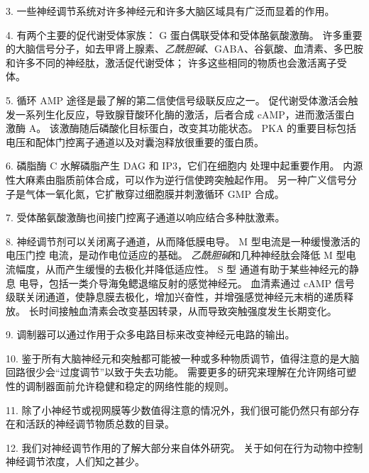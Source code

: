 3. 一些神经调节系统对许多神经元和许多大脑区域具有广泛而显着的作用。


4. 有两个主要的促代谢受体家族：
G 蛋白偶联受体和受体酪氨酸激酶。 
许多重要的大脑信号分子，如去甲肾上腺素、\textit{乙酰胆碱}、GABA、谷氨酸、血清素、多巴胺和许多不同的神经肽，激活促代谢受体；
许多这些相同的物质也会激活离子受体。 


5. 循环 AMP 途径是最了解的第二信使信号级联反应之一。
促代谢受体激活会触发一系列生化反应，导致腺苷酸环化酶的激活，后者合成 cAMP，进而激活蛋白激酶 A。
该激酶随后磷酸化目标蛋白，改变其功能状态。
PKA 的重要目标包括电压和配体门控离子通道以及对囊泡释放很重要的蛋白质。 


6. 磷脂酶 C 水解磷脂产生 DAG 和 IP3，它们在细胞内  处理中起重要作用。
内源性大麻素由脂质前体合成，可以作为逆行信使跨突触起作用。
另一种广义信号分子是气体一氧化氮，它扩散穿过细胞膜并刺激循环 GMP 合成。


7. 受体酪氨酸激酶也间接门控离子通道以响应结合多种肽激素。 


8. 神经调节剂可以关闭离子通道，从而降低膜电导。
M 型电流是一种缓慢激活的电压门控  电流，是动作电位适应的基础。
\textit{乙酰胆碱}和几种神经肽会降低 M 型电流幅度，从而产生缓慢的去极化并降低适应性。
S 型  通道有助于某些神经元的静息  电导，包括一类介导海兔鳃退缩反射的感觉神经元。
血清素通过 cAMP 信号级联关闭通道，使静息膜去极化，增加兴奋性，并增强感觉神经元末梢的递质释放。
长时间接触血清素会改变基因转录，从而导致突触强度发生长期变化。 


9. 调制器可以通过作用于众多电路目标来改变神经元电路的输出。 


10. 鉴于所有大脑神经元和突触都可能被一种或多种物质调节，值得注意的是大脑回路很少会“过度调节”以致于失去功能。
需要更多的研究来理解在允许网络可塑性的调制器面前允许稳健和稳定的网络性能的规则。


11. 除了小神经节或视网膜等少数值得注意的情况外，我们很可能仍然只有部分存在和活跃的神经调节物质总数的目录。


12. 我们对神经调节作用的了解大部分来自体外研究。
关于如何在行为动物中控制神经调节浓度，人们知之甚少。





